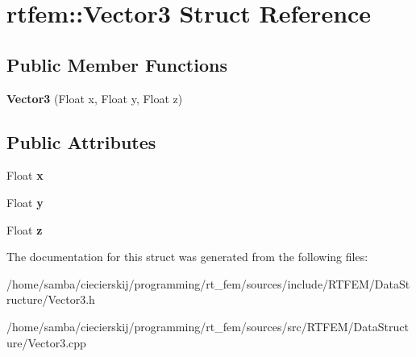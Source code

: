 \hypertarget{structrtfem_1_1Vector3}{}\section{rtfem\+:\+:Vector3 Struct Reference}
\label{structrtfem_1_1Vector3}
\subsection*{Public Member Functions}
\begin{DoxyCompactItemize}
\item 
\mbox{\label{structrtfem_1_1Vector3_abec75a38bc889cc7273d3c1c0a621bf4}} 
{\bfseries Vector3} (Float x, Float y, Float z)
\end{DoxyCompactItemize}
\subsection*{Public Attributes}
\begin{DoxyCompactItemize}
\item 
\mbox{\label{structrtfem_1_1Vector3_aea27ef39c4e58a66805a76e1deb3b327}} 
Float {\bfseries x}
\item 
\mbox{\label{structrtfem_1_1Vector3_abb1fbc315645530836cead78c7f4b989}} 
Float {\bfseries y}
\item 
\mbox{\label{structrtfem_1_1Vector3_a1cfbad91bdd38c76214eb6d4c584e931}} 
Float {\bfseries z}
\end{DoxyCompactItemize}


The documentation for this struct was generated from the following files\+:\begin{DoxyCompactItemize}
\item 
/home/samba/ciecierskij/programming/rt\+\_\+fem/sources/include/\+R\+T\+F\+E\+M/\+Data\+Structure/Vector3.\+h\item 
/home/samba/ciecierskij/programming/rt\+\_\+fem/sources/src/\+R\+T\+F\+E\+M/\+Data\+Structure/Vector3.\+cpp\end{DoxyCompactItemize}
